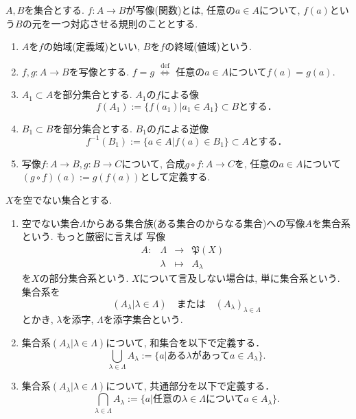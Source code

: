 \documentclass[dvipdfmx,a4paper,11pt]{article}
\theoremstyle{definition}
\begin{document}
\begin{tcolorbox}[
    colback = white,
    colframe = black!35!black,
    fonttitle = \bfseries,
    breakable = true]
    $A,B$を集合とする. $f :A \to B$が写像(関数)とは, 任意の$a \in A$について, $f(a)$という$B$の元を一つ対応させる規則のこととする. 
  
    \begin{enumerate}
    \setlength{\parskip}{0cm} 
  \setlength{\itemsep}{0cm} 
    \item $A$を$f$の始域(定義域)といい, $B$を$f$の終域(値域)という. 
    \item $f, g : A \to B$を写像とする. $f=g$ $\stackrel{\mathrm{def}}{\Longleftrightarrow}$ 任意の$a \in A$について$f(a)=g(a)$.
    \item $A_1 \subset A$を部分集合とする. $A_1$の$f$による像
    $$f(A_1):= \{ f(a_1) | a_1 \in A_1\} \subset B \text{とする．}$$ 
    \item $B_1 \subset B$を部分集合とする. $B_1$の$f$による逆像
    $$f^{-1}(B_1):= \{ a \in A | f(a) \in B_1\} \subset A \text{とする．}$$ 
    \item 写像$f : A \to B, g : B \to C$について, 合成$g \circ f : A \to C$を, 任意の$a \in A$について$(g \circ f)(a):=g(f(a))$として定義する.
    \end{enumerate}
 \end{tcolorbox}
 
 \begin{tcolorbox}[
    colback = white,
    colframe = black!35!black,
    fonttitle = \bfseries,
    breakable = true]
 $X$を空でない集合とする. 
  
    \begin{enumerate}
    \setlength{\parskip}{0cm} 
  \setlength{\itemsep}{0cm} 
    \item 空でない集合$\Lambda$からある集合族(ある集合のからなる集合)への写像$A$を集合系という. もっと厳密に言えば
    写像
    $$
\begin{array}{ccccc}
A: &\Lambda& \rightarrow & \mathfrak{P}(X)& \\
&\lambda& \longmapsto & 
A_{\lambda}
 &
\end{array}
$$
を$X$の部分集合系という. 
$X$について言及しない場合は, 単に集合系という. 
集合系を
$$
(A_{\lambda} | \lambda \in \Lambda)
\quad
\text{または}
\quad
(A_{\lambda})_{\lambda \in \Lambda}
$$
とかき, $\lambda$を添字, $\Lambda$を添字集合という. 
\item 集合系$(A_{\lambda} | \lambda \in \Lambda)$について, 和集合を以下で定義する．
$$
\bigcup_{\lambda \in \Lambda}A_{\lambda}:=\{a| \text{ある$\lambda$があって$a \in A_{\lambda}$} \}.
$$
\item 集合系$(A_{\lambda} | \lambda \in \Lambda)$について, 共通部分を以下で定義する．
$$
\bigcap_{\lambda \in \Lambda}A_{\lambda}:=\{a| \text{任意の$\lambda \in \Lambda$について$a \in A_{\lambda}$} \}.
$$
    \end{enumerate}
 \end{tcolorbox}
 
\end{document}
